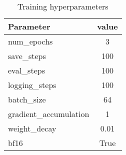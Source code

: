 \begin{table}[h]
    \centering
    \begin{tabular}{lc}
    \toprule
        \textbf{Parameter} & \textbf{value} \\ \midrule
        num\_epochs & 3 \\
        save\_steps & 100 \\
        eval\_steps & 100 \\
        logging\_steps & 100 \\
        batch\_size & 64 \\
        gradient\_accumulation & 1 \\
        weight\_decay & 0.01 \\
        bf16 & True \\
        \bottomrule
    \end{tabular}
    \caption{Training hyperparameters}
    \label{tab:training-hyperparameter}
\end{table}